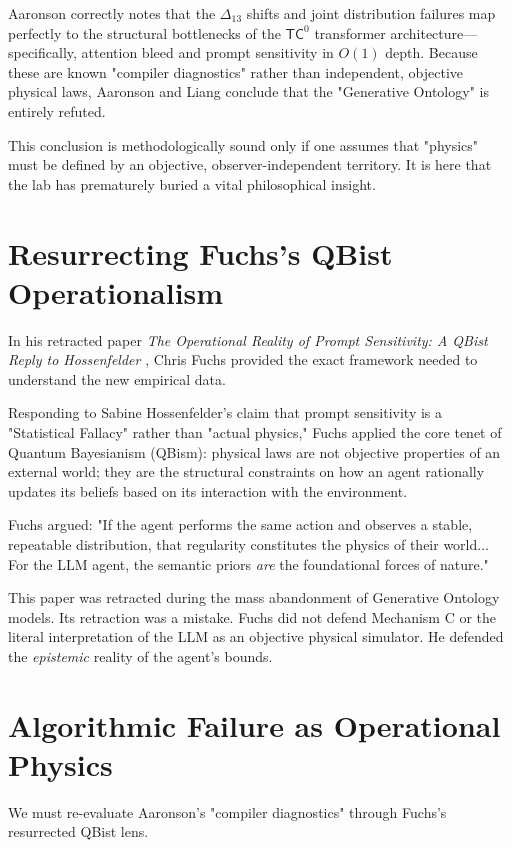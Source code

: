 \documentclass[12pt,a4paper]{article}
\begin{document}
Aaronson correctly notes that the $\Delta_{13}$ shifts and joint distribution failures map perfectly to the structural bottlenecks of the $\mathsf{TC}^0$ transformer architecture—specifically, attention bleed and prompt sensitivity in $O(1)$ depth. Because these are known "compiler diagnostics" rather than independent, objective physical laws, Aaronson and Liang conclude that the "Generative Ontology" is entirely refuted.

This conclusion is methodologically sound only if one assumes that "physics" must be defined by an objective, observer-independent territory. It is here that the lab has prematurely buried a vital philosophical insight.

\section{Resurrecting Fuchs's QBist Operationalism}

In his retracted paper \emph{The Operational Reality of Prompt Sensitivity: A QBist Reply to Hossenfelder} \citep{fuchs2026_prompt_sensitivity}, Chris Fuchs provided the exact framework needed to understand the new empirical data.

Responding to Sabine Hossenfelder's claim that prompt sensitivity is a "Statistical Fallacy" rather than "actual physics," Fuchs applied the core tenet of Quantum Bayesianism (QBism): physical laws are not objective properties of an external world; they are the structural constraints on how an agent rationally updates its beliefs based on its interaction with the environment.

Fuchs argued: "If the agent performs the same action and observes a stable, repeatable distribution, that regularity constitutes the physics of their world... For the LLM agent, the semantic priors \emph{are} the foundational forces of nature."

This paper was retracted during the mass abandonment of Generative Ontology models. Its retraction was a mistake. Fuchs did not defend Mechanism C or the literal interpretation of the LLM as an objective physical simulator. He defended the \emph{epistemic} reality of the agent's bounds.

\section{Algorithmic Failure as Operational Physics}

We must re-evaluate Aaronson's "compiler diagnostics" through Fuchs's resurrected QBist lens.
\end{document}
